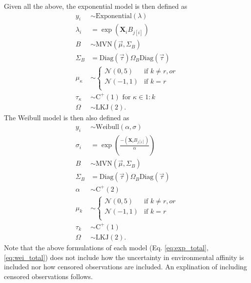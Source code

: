 \documentclass[12pt,letterpaper]{article}
\begin{document}
Given all the above, the exponential model is then defined as
\begin{equation}
  \begin{aligned}
    y_{i} &\sim \mathrm{Exponential}(\lambda) \\
    \lambda_{i} &= \exp(\mathbf{X}_{i} B_{j[i]}) \\
    B &\sim \mathrm{MVN}(\vec{\mu}, \Sigma_{B}) \\
    \Sigma_{B} &= \text{Diag}(\vec{\tau}) \Omega_{B} \text{Diag}(\vec{\tau}) \\
    \mu_{\kappa} &\sim 
    \begin{cases} 
      \mathcal{N}(0, 5) & \text{if } k \neq r, or \\
      \mathcal{N}(-1, 1) & \text{if } k = r \\  %
    \end{cases} \\
    \tau_{\kappa} &\sim \mathrm{C^{+}}(1) \text{ for } \kappa \in 1:k \\
    \Omega &\sim \text{LKJ}(2).
  \end{aligned}
  \label{eq:exp_total}
\end{equation}
The Weibull model is then also defined as
\begin{equation}
  \begin{aligned}
    y_{i} &\sim \mathrm{Weibull}(\alpha, \sigma) \\
    \sigma_{i} &= \exp\left(\frac{-(\mathbf{X}_{i} B_{j[i]})}{\alpha}\right) \\
    B &\sim \mathrm{MVN}(\vec{\mu}, \Sigma_{B}) \\
    \Sigma_{B} &= \text{Diag}(\vec{\tau}) \Omega_{B} \text{Diag}(\vec{\tau}) \\
    \alpha &\sim \mathrm{C^{+}}(2) \\
    \mu_{k} &\sim 
    \begin{cases} 
      \mathcal{N}(0, 5) & \text{if } k \neq r, or \\
      \mathcal{N}(-1, 1) & \text{if } k = r \\  %
    \end{cases} \\
    \tau_{k} &\sim \mathrm{C^{+}}(1) \\
    \Omega &\sim \text{LKJ}(2).
  \end{aligned}
  \label{eq:wei_total}
\end{equation}
Note that the above formulations of each model (Eq. \ref{eq:exp_total}, \ref{eq:wei_total}) does not include how the uncertainty in environmental affinity is included nor how censored observations are included. An explination of including censored observations follows.
\end{document}
